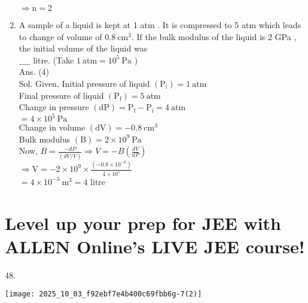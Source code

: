 \documentclass[10pt]{article}
\begin{document}
\begin{enumerate}
\(\Rightarrow \mathrm{n}=2\)
  \item A sample of a liquid is kept at 1 atm . It is compressed to 5 atm which leads to change of volume of \(0.8 \mathrm{~cm}^{3}\). If the bulk modulus of the liquid is 2 GPa , the initial volume of the liquid was\\
\(\_\_\_\_\) litre. (Take \(1 \mathrm{~atm}=10^{5} \mathrm{~Pa}\) )\\
Ans. (4)\\
Sol. Given, Initial pressure of liquid \(\left(\mathrm{P}_{\mathrm{i}}\right)=1 \mathrm{~atm}\)\\
Final pressure of liquid \(\left(\mathrm{P}_{\mathrm{f}}\right)=5 \mathrm{~atm}\)\\
Change in pressure \((\mathrm{dP})=\mathrm{P}_{\mathrm{f}}-\mathrm{P}_{\mathrm{i}}=4 \mathrm{~atm}\)\\
\(=4 \times 10^{5} \mathrm{~Pa}\)\\
Change in volume \((\mathrm{dV})=-0.8 \mathrm{~cm}^{3}\)\\
Bulk modulus \((\mathrm{B})=2 \times 10^{9} \mathrm{~Pa}\)\\
Now, \(B=\frac{-d P}{(d V / V)} \Rightarrow V=-B\left(\frac{d V}{d P}\right)\)\\
\(\Rightarrow \mathrm{V}=-2 \times 10^{9} \times \frac{\left(-0.8 \times 10^{-6}\right)}{4 \times 10^{5}}\)\\
\(=4 \times 10^{-3} \mathrm{~m}^{3}=4\) litre
\end{enumerate}

\section*{Level up your prep for JEE with ALLEN Online's LIVE JEE course!}
48.

\begin{center}
\texttt{[image: 2025\_10\_03\_f92ebf7e4b400c69fbb6g-7(2)]}
\end{center}
\end{document}
